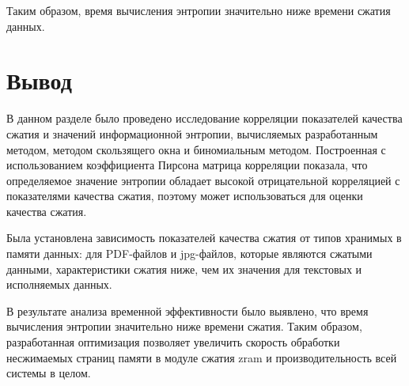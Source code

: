 Таким образом, время вычисления энтропии значительно ниже времени сжатия данных.

\section*{Вывод}

В данном разделе было проведено исследование корреляции показателей качества сжатия и значений информационной энтропии, вычисляемых разработанным методом, методом скользящего окна и биномиальным методом. Построенная с использованием коэффициента Пирсона матрица корреляции показала, что определяемое значение энтропии обладает высокой отрицательной корреляцией с показателями качества сжатия, поэтому может использоваться для оценки качества сжатия.

Была установлена зависимость показателей качества сжатия от типов хранимых в памяти данных: для PDF-файлов и jpg-файлов, которые являются сжатыми данными, характеристики сжатия ниже, чем их значения для текстовых и исполняемых данных.

В результате анализа временной эффективности было выявлено, что время вычисления энтропии значительно ниже времени сжатия. Таким образом, разработанная оптимизация позволяет увеличить скорость обработки несжимаемых страниц памяти в модуле сжатия zram и производительность всей системы в целом.
